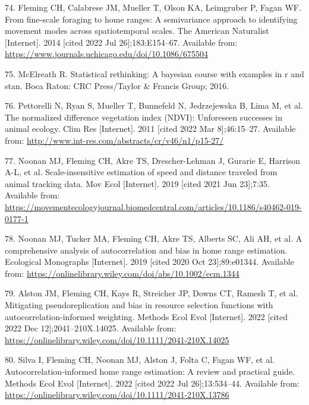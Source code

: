 \documentclass[
  12pt,
]{article}
\newlength{\cslhangindent}
\newenvironment{CSLReferences}[2] %
 {\begin{list}{}{%
  \setlength{\itemindent}{0pt}
  \setlength{\leftmargin}{0pt}
  \setlength{\parsep}{0pt}
  \ifodd #1
   \setlength{\leftmargin}{\cslhangindent}
   \setlength{\itemindent}{-1\cslhangindent}
  \fi
  \setlength{\itemsep}{#2\baselineskip}}}
 {\end{list}}
\begin{document}
\begin{CSLReferences}{0}{1}
74. Fleming CH, Calabrese JM, Mueller T, Olson KA, Leimgruber P, Fagan WF. From fine-scale foraging to home ranges: A semivariance approach to identifying movement modes across spatiotemporal scales. The American Naturalist {[}Internet{]}. 2014 {[}cited 2022 Jul 26{]};183:E154--67. Available from: \url{https://www.journals.uchicago.edu/doi/10.1086/675504}

75. McElreath R. Statistical rethinking: A bayesian course with examples in r and stan. Boca Raton: {CRC} Press/Taylor \& Francis Group; 2016.

76. Pettorelli N, Ryan S, Mueller T, Bunnefeld N, Jedrzejewska B, Lima M, et al. The normalized difference vegetation index ({NDVI}): Unforeseen successes in animal ecology. Clim Res {[}Internet{]}. 2011 {[}cited 2022 Mar 8{]};46:15--27. Available from: \url{http://www.int-res.com/abstracts/cr/v46/n1/p15-27/}

77. Noonan MJ, Fleming CH, Akre TS, Drescher-Lehman J, Gurarie E, Harrison A-L, et al. Scale-insensitive estimation of speed and distance traveled from animal tracking data. Mov Ecol {[}Internet{]}. 2019 {[}cited 2021 Jun 23{]};7:35. Available from: \url{https://movementecologyjournal.biomedcentral.com/articles/10.1186/s40462-019-0177-1}

78. Noonan MJ, Tucker MA, Fleming CH, Akre TS, Alberts SC, Ali AH, et al. A comprehensive analysis of autocorrelation and bias in home range estimation. Ecological Monographs {[}Internet{]}. 2019 {[}cited 2020 Oct 23{]};89:e01344. Available from: \url{https://onlinelibrary.wiley.com/doi/abs/10.1002/ecm.1344}

79. Alston JM, Fleming CH, Kays R, Streicher JP, Downs CT, Ramesh T, et al. Mitigating pseudoreplication and bias in resource selection functions with autocorrelation‐informed weighting. Methods Ecol Evol {[}Internet{]}. 2022 {[}cited 2022 Dec 12{]};2041--210X.14025. Available from: \url{https://onlinelibrary.wiley.com/doi/10.1111/2041-210X.14025}

80. Silva I, Fleming CH, Noonan MJ, Alston J, Folta C, Fagan WF, et al. Autocorrelation‐informed home range estimation: A review and practical guide. Methods Ecol Evol {[}Internet{]}. 2022 {[}cited 2022 Jul 26{]};13:534--44. Available from: \url{https://onlinelibrary.wiley.com/doi/10.1111/2041-210X.13786}


\end{CSLReferences}
\end{document}
